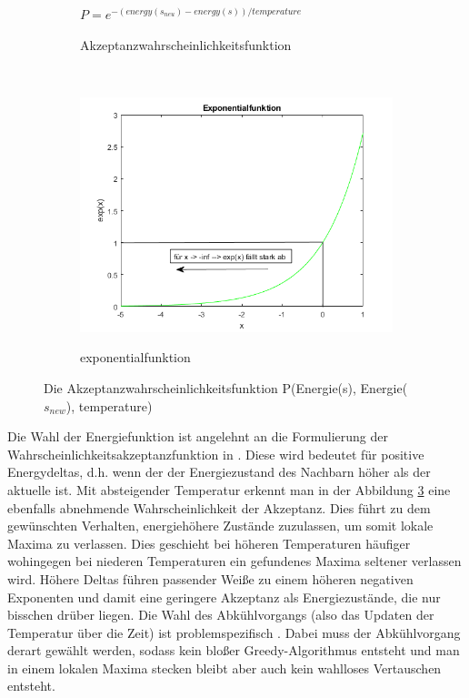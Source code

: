 \begin{figure}[H]
    \centering
    \begin{subfigure}[b]{0.4\textwidth}
        \centering $P = e^{-(energy(s_{neu}) - energy(s))/ temperature}$
        \label{fig:APF}
        \caption{Akzeptanzwahrscheinlichkeitsfunktion}
    \end{subfigure}
    ~ %
    \begin{subfigure}[b]{0.7\textwidth}
        \centering \includegraphics[interpolate=false,width=\linewidth]{content/simulatedAnnealing/Bilder/exponentialfunktion_as_PDF.png}
        \label{fig:exponentialfunktion}
        \caption{exponentialfunktion}
    \end{subfigure}

    \caption{Die Akzeptanzwahrscheinlichkeitsfunktion P(Energie(s), Energie($s_{new}$), temperature)}
\end{figure}

Die Wahl der Energiefunktion ist angelehnt an die Formulierung der 
Wahrscheinlichkeitsakzeptanzfunktion in \cite{Kirkpatrick671}. 
Diese wird bedeutet für positive Energydeltas, d.h. wenn der der Energiezustand
des Nachbarn höher als der aktuelle ist. Mit absteigender Temperatur erkennt man 
in der Abbildung \ref{fig:exponentialfunktion} eine ebenfalls abnehmende Wahrscheinlichkeit
der Akzeptanz. Dies führt zu dem gewünschten Verhalten, energiehöhere Zustände 
zuzulassen, um somit lokale Maxima zu verlassen. Dies geschieht bei höheren 
Temperaturen häufiger wohingegen bei niederen Temperaturen ein gefundenes Maxima
seltener verlassen wird. Höhere Deltas führen passender Weiße zu einem höheren negativen 
Exponenten und damit eine geringere Akzeptanz als Energiezustände, die nur bisschen 
drüber liegen. Die Wahl des Abkühlvorgangs (also das Updaten der Temperatur über die Zeit)
ist problemspezifisch \cite[S. 9]{Kirkpatrick671}. Dabei muss der Abkühlvorgang derart
gewählt werden, sodass kein bloßer Greedy-Algorithmus entsteht und man in einem lokalen 
Maxima stecken bleibt aber auch kein wahlloses Vertauschen entsteht.

